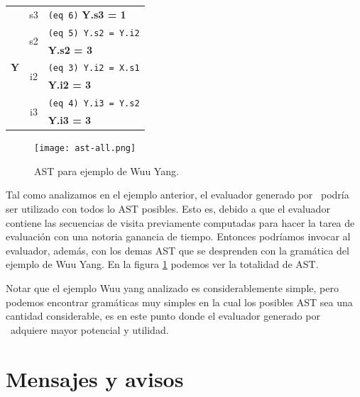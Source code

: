 \begin{center}
\begin{tabular}{|| c | c | l ||}
\multirow{7}{*}{\textbf{Y}} &                  s3 & \texttt{(eq 6)} \textbf{Y.s3 = 1} \\ \cline{2-3}
                           & \multirow{2}{*}{s2} &    \texttt{(eq 5) Y.s2 = Y.i2} \\
                           &                     & \textbf{Y.s2 = 3} \\ \cline{2-3}
                           & \multirow{2}{*}{i2} & \texttt{(eq 3) Y.i2 = X.s1} \\
                           &                     & \textbf{Y.i2 = 3} \\ \cline{2-3}
                           & \multirow{2}{*}{i3} & \texttt{(eq 4) Y.i3 = Y.s2} \\
                           &                     & \textbf{Y.i3 = 3} \\
\hline \hline


\end{tabular}\end{center}

\begin{figure}\centering
\texttt{[image: ast-all.png]}
\caption{\label{fig:allast} AST para ejemplo de Wuu Yang.}
\end{figure}

Tal como analizamos en el ejemplo anterior, el evaluador generado por \maggen\ podría ser utilizado con todos lo AST posibles. Esto es, debido a que el evaluador contiene las secuencias de visita previamente computadas para hacer la tarea de evaluación con una notoria ganancia de tiempo. Entonces podríamos invocar al evaluador, además, con los demas AST que se desprenden con la gramática del ejemplo de Wuu Yang. En la figura \ref{fig:allast} podemos ver la totalidad de AST.

Notar que el ejemplo Wuu yang analizado es considerablemente simple, pero podemos encontrar gramáticas muy simples en la cual los posibles AST sea una cantidad considerable, es en este punto donde el evaluador generado por \maggen\ adquiere mayor potencial y utilidad.

\section{Mensajes y avisos}

